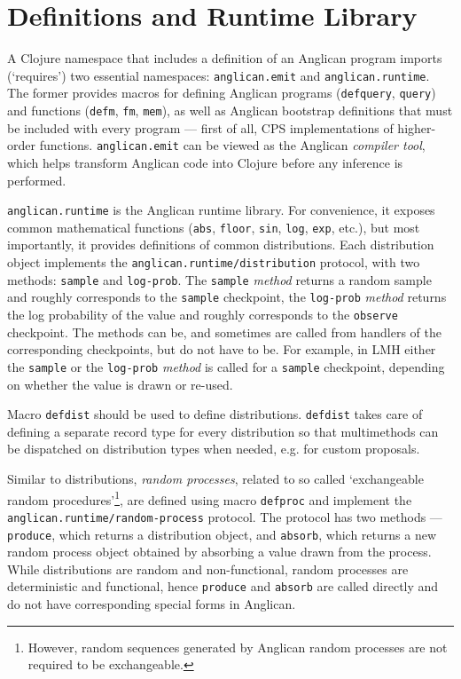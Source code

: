 \documentclass[preprint]{sigplanconf}
\begin{document}
\section{Definitions and Runtime Library}

A Clojure namespace that includes a definition of an Anglican
program imports (`requires') two essential namespaces:
\texttt{anglican.emit} and \texttt{anglican.runtime}. The former
provides macros for defining Anglican programs
(\texttt{defquery}, \texttt{query}) and functions
(\texttt{defm}, \texttt{fm}, \texttt{mem}), as well as Anglican
bootstrap definitions that must be included with every program
--- first of all, CPS implementations of higher-order functions.
\texttt{anglican.emit} can be viewed as the Anglican
\textit{compiler tool}, which helps transform Anglican code into
Clojure before any inference is performed.

\texttt{anglican.runtime} is the Anglican runtime library. For
convenience, it exposes common mathematical functions
(\texttt{abs}, \texttt{floor}, \texttt{sin}, \texttt{log},
\texttt{exp}, etc.), but most importantly, it provides
definitions of common distributions. Each distribution object
implements the \texttt{anglican.runtime/{\linebreak[0]}distribution} protocol,
with two methods: \texttt{sample} and \texttt{log-prob}.
The \texttt{sample} \textit{method} returns a random sample and
roughly corresponds to the \texttt{sample} checkpoint,
the \texttt{log-prob} \textit{method} returns the log probability
of the value and roughly corresponds to the \texttt{observe}
checkpoint. The methods can be, and sometimes are called from
handlers of the corresponding checkpoints, but do not have to
be. For example, in LMH either the \texttt{sample} or
the \texttt{log-prob} \textit{method} is called for a
\texttt{sample} checkpoint, depending on whether the value is
drawn or re-used. 

Macro \texttt{defdist} should be used to define distributions.
\texttt{defdist} takes care of defining a separate record type
for every distribution so that multimethods can be dispatched on
distribution types when needed, e.g. for custom proposals.

Similar to distributions, \textit{random processes}, related to
so called `exchangeable random procedures'\footnote{However, random sequences
generated by Anglican random processes are not required to be
exchangeable.}, are defined using
macro \texttt{defproc} and implement the
\texttt{anglican.runtime/{\linebreak[0]}random-process} protocol. The protocol
has two methods --- \texttt{produce}, which returns a
distribution object, and \texttt{absorb}, which returns a new
random process object obtained by absorbing a value drawn from
the process. While distributions are random and non-functional,
random processes are deterministic and functional, hence
\texttt{produce} and \texttt{absorb} are called directly and do
not have corresponding special forms in Anglican.
\end{document}
